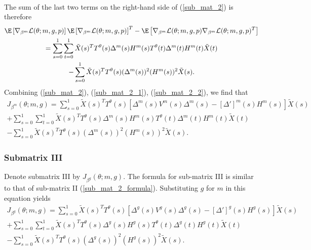 \documentclass[11pt]{article}
\begin{document}
\begin{appendices}
\begin{refsection}
\begin{multline*}
\end{multline*}
The sum of the last two terms on the right-hand side of (\ref{sub_mat_2}) is therefore
\begin{multline}\label{sub_mat_2_2}
 \E \left[ \nabla_{\beta^m} \mathcal{L}(\theta; m, g, p) \right] \E \left[ \nabla_{\beta^m} \mathcal{L}(\theta; m, g, p) \right]^T - \E \left[\nabla_{\beta^m} \mathcal{L}(\theta; m, g, p) \nabla_{\beta^m} \mathcal{L}(\theta; m, g, p)^T \right] \\ =
\sum_{s=0}^1 \sum_{t=0}^1 \tilde{X}(s)^T {T}^\theta(s) {\Delta}^m(s) {H}^m(s) T^{\theta}(t) {\Delta}^m(t) {H}^m(t) \tilde{X}(t) \\ - \sum_{s=0}^1 \tilde{X}(s)^T {T}^\theta(s) ({\Delta}^m(s))^2 ({H}^m(s))^2 \tilde{X}(s). \end{multline}
Combining (\ref{sub_mat_2}), (\ref{sub_mat_2_1}), (\ref{sub_mat_2_2}), we find that
\begin{multline}\label{sub_mat_2_formula}
J_{\beta^m}(\theta; m, g) = \sum_{s=0}^1 \tilde{X}(s)^T T^{\theta}(s) \left[ {\Delta}^m(s) {V}^m(s) {\Delta}^m(s) - [{\Delta}']^m(s) {H}^m(s) \right] \tilde{X}(s) \\ + \sum_{s=0}^1 \sum_{t=0}^1 \tilde{X}(s)^T {T}^\theta(s) {\Delta}^m(s) {H}^m(s) {T}^\theta(t) {\Delta}^m(t) {H}^m(t) \tilde{X}(t) \\ - \sum_{s=0}^1 \tilde{X}(s)^T T^{\theta}(s) ({\Delta}^m(s))^2 ({H}^m(s))^2 \tilde{X}(s).
\end{multline}

\subsubsection*{Submatrix III}
Denote submatrix III by $J_{\beta^g}(\theta; m, g).$ The formula for sub-matrix III is similar to that of sub-matrix II (\ref{sub_mat_2_formula}). Substituting $g$ for $m$ in this equation yields
\begin{multline}\label{sub_mat_3_formula}
J_{\beta^g}(\theta; m, g) = \sum_{s=0}^1 \tilde{X}(s)^T T^{\theta}(s) \left[{\Delta}^g(s) {V}^g(s) {\Delta}^g(s) - [{\Delta}']^g(s) {H}^g(s) \right] \tilde{X}(s) \\ + \sum_{s=0}^1 \sum_{t=0}^1 \tilde{X}(s)^T {T}^\theta(s) {\Delta}^g(s) {H}^g(s) {T}^\theta(t) {\Delta}^g(t) {H}^g(t) \tilde{X}(t) \\ - \sum_{s=0}^1 \tilde{X}(s)^T T^{\theta}(s) ({\Delta}^g(s))^2 ({H}^g(s))^2 \tilde{X}(s).
\end{multline}


\end{refsection}
\end{appendices}
\end{document}
